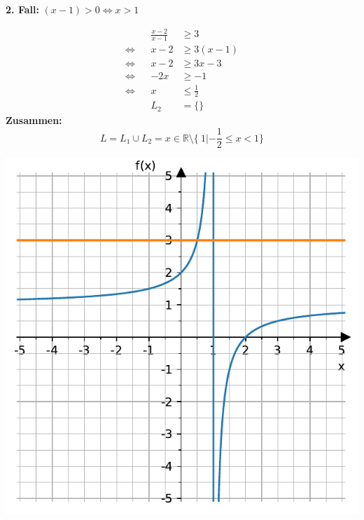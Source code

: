 \documentclass[
  ignorenonframetext,
  aspectratio=169,
]{beamer}
\begin{document}
\begin{frame}
\textbf{2. Fall:} \((x-1) > 0 \Leftrightarrow x > 1\)

\[
\begin{aligned}
&& \frac{x-2}{x-1} & \geq 3 \\
\Leftrightarrow &&x-2 & \geq  3(x-1)\\
\Leftrightarrow &&x-2 & \geq  3x-3\\
\Leftrightarrow &&-2x & \geq  -1\\
\Leftrightarrow &&x & \leq  \frac{1}{2}\\
&& L_2 &=\{\}
\end{aligned}
\] \textbf{Zusammen:} \[
L= L_1 \cup L_2 = {x \in \mathbb{R}\setminus \{\ 1}|-\frac{1}{2}\leq x < 1\}
\]
\end{frame}

\begin{frame}
\includegraphics{3_Gleichungen_files/figure-beamer/cell-10-output-1.pdf}
\end{frame}
\end{document}
